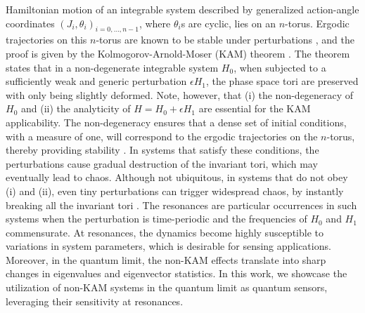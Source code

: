 \documentclass[amsmath,nobibnotes,aps,amssymb,pra, prl,aps,showpacs,superscriptaddress,twocolumn, longbibliography, reprint]{revtex4-2}
\begin{document}
\iffalse

Hamiltonian motion of an integrable system described by generalized action-angle coordinates $(J_i, \theta_i)_{i=0, ..., n-1}$, where $\theta_i$s are cyclic, lies on an $n$-torus. Ergodic trajectories on this $n$-torus are known to be stable under perturbations \cite{poschel2009lecture}, and the proof is given by the Kolmogorov-Arnold-Moser (KAM) theorem \cite{arnold2009proof, kolmogorov1954conservation, moser1962invariant, moser1967convergent}. The theorem states that in a non-degenerate integrable system $H_0$, when subjected to a sufficiently weak and generic perturbation $\epsilon H_1$, the phase space tori are preserved with only being slightly deformed. Note, however, that (i) the non-degeneracy of $H_0$ and (ii) the analyticity of $H=H_0+\epsilon H_1$ are essential for the KAM applicability. The non-degeneracy ensures that a dense set of initial conditions, with a measure of one, will correspond to the ergodic trajectories on the $n$-torus, thereby providing stability \cite{poschel2009lecture}. In systems that satisfy these conditions, the perturbations cause gradual destruction of the invariant tori, which may eventually lead to chaos. Although not ubiquitous, in systems that do not obey (i) and (ii), even tiny perturbations can trigger widespread chaos, 
by instantly breaking all the invariant tori \cite{sankaranarayanan2001quantum, sankaranarayanan2001chaos, varikuti2023probing}. The resonances are particular occurrences in such systems when the perturbation is time-periodic and the frequencies of $H_0$ and $H_1$ commensurate. At resonances, the dynamics become highly susceptible to variations in system parameters, which is desirable for sensing applications. Moreover, in the quantum limit, the non-KAM effects translate into sharp changes in eigenvalues and eigenvector statistics. In this work, we showcase the utilization of non-KAM systems in the quantum limit as quantum sensors, leveraging their sensitivity at resonances. 
\end{document}
